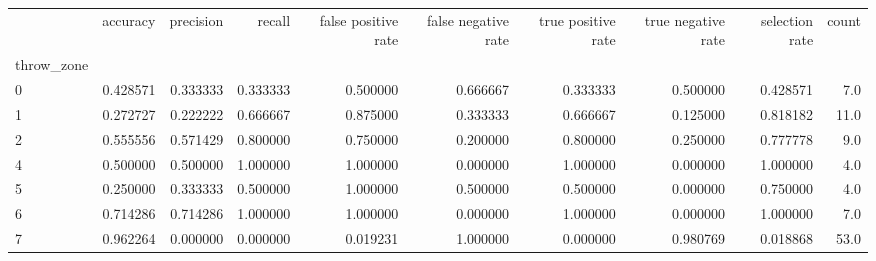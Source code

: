 \begin{tabular}{lrrrrrrrrr}
\toprule
{} &  accuracy &  precision &    recall &  false positive rate &  false negative rate &  true positive rate &  true negative rate &  selection rate &  count \\
throw\_zone &           &            &           &                      &                      &                     &                     &                 &        \\
\midrule
0          &  0.428571 &   0.333333 &  0.333333 &             0.500000 &             0.666667 &            0.333333 &            0.500000 &        0.428571 &    7.0 \\
1          &  0.272727 &   0.222222 &  0.666667 &             0.875000 &             0.333333 &            0.666667 &            0.125000 &        0.818182 &   11.0 \\
2          &  0.555556 &   0.571429 &  0.800000 &             0.750000 &             0.200000 &            0.800000 &            0.250000 &        0.777778 &    9.0 \\
4          &  0.500000 &   0.500000 &  1.000000 &             1.000000 &             0.000000 &            1.000000 &            0.000000 &        1.000000 &    4.0 \\
5          &  0.250000 &   0.333333 &  0.500000 &             1.000000 &             0.500000 &            0.500000 &            0.000000 &        0.750000 &    4.0 \\
6          &  0.714286 &   0.714286 &  1.000000 &             1.000000 &             0.000000 &            1.000000 &            0.000000 &        1.000000 &    7.0 \\
7          &  0.962264 &   0.000000 &  0.000000 &             0.019231 &             1.000000 &            0.000000 &            0.980769 &        0.018868 &   53.0 \\
\bottomrule
\end{tabular}
